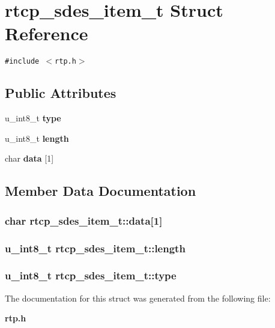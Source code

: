 \section{rtcp\_\-sdes\_\-item\_\-t Struct Reference}
\label{structrtcp__sdes__item__t}
{\tt \#include $<$rtp.h$>$}

\subsection*{Public Attributes}
\begin{CompactItemize}
\item 
u\_\-int8\_\-t {\bf type}
\item 
u\_\-int8\_\-t {\bf length}
\item 
char {\bf data} [1]
\end{CompactItemize}


\subsection{Member Data Documentation}
\subsubsection{\setlength{\rightskip}{0pt plus 5cm}char {\bf rtcp\_\-sdes\_\-item\_\-t::data}[1]}\label{structrtcp__sdes__item__t_o2}


\subsubsection{\setlength{\rightskip}{0pt plus 5cm}u\_\-int8\_\-t {\bf rtcp\_\-sdes\_\-item\_\-t::length}}\label{structrtcp__sdes__item__t_o1}


\subsubsection{\setlength{\rightskip}{0pt plus 5cm}u\_\-int8\_\-t {\bf rtcp\_\-sdes\_\-item\_\-t::type}}\label{structrtcp__sdes__item__t_o0}




The documentation for this struct was generated from the following file:\begin{CompactItemize}
\item 
{\bf rtp.h}\end{CompactItemize}
